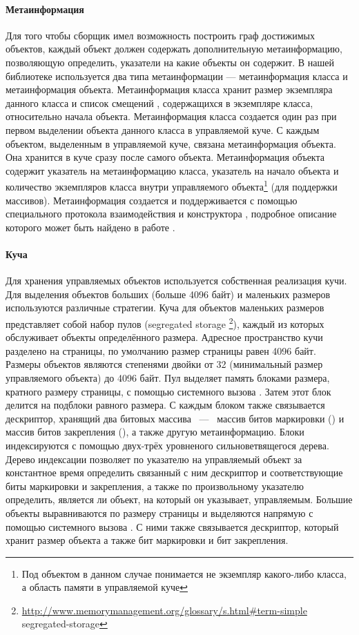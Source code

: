 \paragraph{Метаинформация}
Для того чтобы сборщик имел возможность построить граф достижимых объектов, каждый объект 
должен содержать дополнительную метаинформацию, позволяющую определить, указатели на какие 
объекты он содержит. 
В нашей библиотеке используется два типа метаинформации --- метаинформация класса и 
метаинформация объекта. 
Метаинформация класса хранит размер экземпляра данного класса и список смещений , 
содержащихся в экземпляре класса, относительно начала объекта. 
Метаинформация класса создается один раз при первом выделении объекта данного класса в 
управляемой куче. 
С каждым объектом, выделенным в управляемой куче, связана метаинформация объекта. 
Она хранится в куче сразу после самого объекта. 
Метаинформация объекта содержит указатель на метаинформацию класса, указатель на начало 
объекта и количество экземпляров класса внутри управляемого 
объекта\footnote{Под объектом в данном случае понимается не экземпляр какого-либо класса, 
а область памяти в управляемой куче} (для поддержки массивов). 
Метаинформация создается и поддерживается с помощью специального протокола взаимодействия 
 и конструктора , подробное описание которого может быть найдено 
в работе \cite{book:precisegc_secr}.

\paragraph{Куча}
\label{sec:heap}
Для хранения управляемых объектов используется собственная реализация кучи. 
Для выделения объектов больших (больше 4096 байт) и маленьких размеров используются 
различные стратегии. 
Куча для объектов маленьких размеров представляет собой набор пулов 
(segregated storage
\footnote{\url{http://www.memorymanagement.org/glossary/s.html\#term-simple}\\
{segregated-storage}}), 
каждый из которых обслуживает объекты определённого размера. 
Адресное пространство кучи разделено на страницы, по умолчанию размер страницы равен 4096 байт. 
Размеры объектов являются степенями двойки от 32 (минимальный размер управляемого объекта) до 
4096 байт. 
Пул выделяет память блоками размера, кратного размеру страницы, с помощью системного вызова 
. 
Затем этот блок делится на подблоки равного размера. 
С каждым блоком также связывается дескриптор, хранящий два битовых массива ~---~ 
массив битов маркировки () и массив битов закрепления (), 
а также другую метаинформацию. 
Блоки индексируются с помощью двух-трёх уровненого сильноветвящегося дерева. 
Дерево индексации позволяет по указателю на управляемый объект за константное время 
определить связанный с ним дескриптор и соответствующие биты маркировки и закрепления, 
а также по произвольному указателю определить, является ли объект, на который он указывает, 
управляемым. 
Большие объекты выравниваются по размеру страницы и выделяются напрямую с помощью системного 
вызова . 
С ними также связывается дескриптор, который хранит размер объекта а также бит маркировки и 
бит закрепления.

